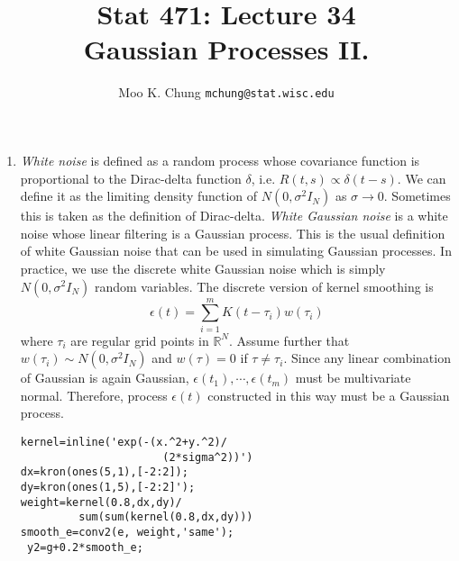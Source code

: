 \documentclass[10pt,twocolumn]{article} %
\begin{document}
\title{Stat 471: Lecture 34\\
Gaussian Processes II.}
\author{Moo K. Chung \tt{mchung@stat.wisc.edu}}
\maketitle \thispagestyle{empty}



\begin{enumerate}

\item {\em White noise} is defined as a random process whose
covariance function is proportional to the Dirac-delta function
$\delta$, i.e. $R(t,s) \propto \delta(t-s)$. We can define it as
the limiting density function of $N(0,\sigma^2I_N)$ as $\sigma \to
0$. %
Sometimes this is taken as the definition of
Dirac-delta. {\em White Gaussian noise} is a white noise whose
linear filtering is a Gaussian process. This is the usual
definition of white Gaussian noise that can be used in simulating
Gaussian processes. In practice, we use the discrete white
Gaussian noise which is simply $N(0,\sigma^2I_N)$ random
variables. The discrete version of kernel smoothing is
$$\epsilon(t) = \sum_{i=1}^m K(t-\tau_i)w(\tau_i)$$
where $\tau_i$ are regular grid points in $\mathbb{R}^N$. Assume
further that $w(\tau_i) \sim N(0,\sigma^2I_N)$ and $w(\tau)=0$ if
$\tau \neq \tau_i$. Since any linear combination of Gaussian is
again Gaussian, $\epsilon(t_1), \cdots, \epsilon(t_m)$ must be
multivariate normal. Therefore, process $\epsilon(t)$ constructed
in this way must be a Gaussian process.
\begin{verbatim}
kernel=inline('exp(-(x.^2+y.^2)/
                      (2*sigma^2))')
dx=kron(ones(5,1),[-2:2]);
dy=kron(ones(1,5),[-2:2]');
weight=kernel(0.8,dx,dy)/
         sum(sum(kernel(0.8,dx,dy)))
smooth_e=conv2(e, weight,'same');
 y2=g+0.2*smooth_e;
\end{verbatim}


\end{enumerate}
\end{document}
